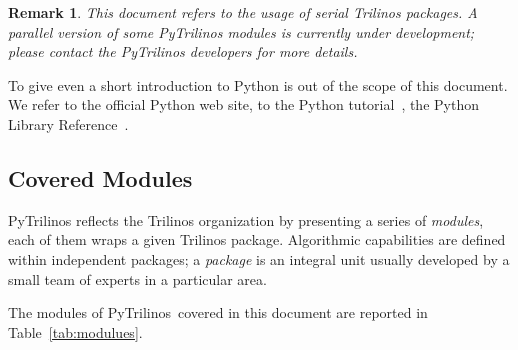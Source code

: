 \documentclass[10pt,relax]{SANDreport}
\newcommand{\PyTrilinos}{{PyTrilinos}}
\newtheorem{remark}{Remark}
\begin{document}
\begin{remark}
This document refers to the usage of serial Trilinos packages. A parallel
version of some PyTrilinos modules is currently under development; please
contact the PyTrilinos developers for more details.
\end{remark}

To give even a short introduction to Python is out of the scope of this
document. We refer to the official Python web site, to the Python
tutorial~\cite{python-tutorial}, the Python Library
Reference~\cite{python-library-reference}.

\subsection{Covered Modules}

PyTrilinos reflects the Trilinos organization by presenting
a series of {\sl modules}, each of them wraps a given Trilinos package.
Algorithmic capabilities are defined within independent packages; a {\sl
  package} is an integral unit usually developed by a small team of experts in
  a particular area. 

The modules of \PyTrilinos\ covered in this document are reported in
Table~\ref{tab:modulues}.
\end{document}
